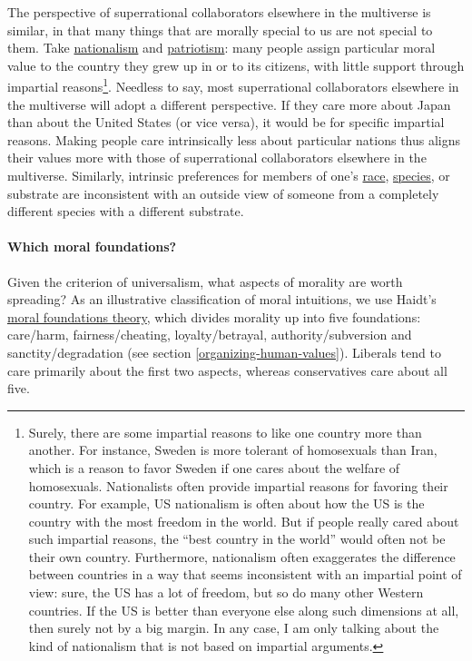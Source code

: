 The perspective of superrational collaborators elsewhere in the
multiverse is similar, in that many things that are morally special to
us are not special to them. Take
\href{https://en.wikipedia.org/wiki/Nationalism}{nationalism} and
\href{https://en.wikipedia.org/wiki/Patriotism}{patriotism}: many
people assign particular moral value to the country they grew up in or
to its citizens, with little support through impartial reasons\footnote{Surely,
  there are some impartial reasons to like one country more than
  another. For instance, Sweden is more tolerant of homosexuals than
  Iran, which is a reason to favor Sweden if one cares about the welfare
  of homosexuals. Nationalists often provide impartial reasons for
  favoring their country. For example, US nationalism is often about how
  the US is the country with the most freedom in the world. But if
  people really cared about such impartial reasons, the ``best country
  in the world'' would often not be their own country. Furthermore,
  nationalism often exaggerates the difference between countries in a
  way that seems inconsistent with an impartial point of view: sure, the
  US has a lot of freedom, but so do many other Western countries. If the US is
  better than everyone else along such dimensions at all, then surely not by a big margin.
  In any case, I am only talking about the kind of nationalism
  that is not based on impartial arguments.}. Needless to say, most
superrational collaborators elsewhere in the multiverse will adopt a
different perspective. If they care more about Japan than about the
United States (or vice versa), it would be for specific impartial
reasons. Making people care intrinsically less about particular nations
thus aligns their values more with those of superrational collaborators
elsewhere in the multiverse. Similarly, intrinsic preferences for
members of one's
\href{https://en.wikipedia.org/wiki/Racism}{race},
\href{https://en.wikipedia.org/wiki/Speciesism}{species}, or
substrate are inconsistent with an outside view of someone from a
completely different species with a different substrate.

\paragraph{Which moral foundations?}\label{which-moral-foundations}

Given the criterion of universalism, what aspects of morality are worth
spreading? As an illustrative classification of moral intuitions, we use
Haidt's
\href{https://en.wikipedia.org/wiki/Moral_foundations_theory}{moral
foundations theory}, which divides morality up into five foundations:
care/harm, fairness/cheating, loyalty/betrayal, authority/subversion and
sanctity/degradation (see section
\ref{organizing-human-values}). Liberals tend to care primarily about the first two
aspects, whereas conservatives care about all five.

